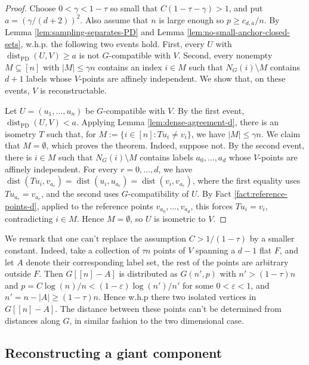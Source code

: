 \documentclass[fullpage,11pt]{article}
\newcommand{\PD}{\mathrm{PD}}
\providecommand{\dist}{\operatorname{dist}}
\theoremstyle{break}
\theoremstyle{definition}
\theoremstyle{break}
\begin{document}
\begin{proof}
Choose \(0<\gamma<1-\tau\) so small that
\(C(1-\tau-\gamma)>1\), and put \(a=(\gamma/(d+2))^2\). Also assume that
\(n\) is large enough so \(p\ge c_{d,a}/n\). By
Lemma \ref{lem:sampling-separates-PD} and Lemma \ref{lem:no-small-anchor-closed-sets},
w.h.p. the following two events hold. First, every \(U\) with
\(\dist_{\PD}(U,V)\ge a\) is not \(G\)-compatible with \(V\). Second, every
nonempty \(M\subseteq[n]\) with \(|M|\le\gamma n\) contains an index
\(i\in M\) such that \(N_G(i)\setminus M\) contains \(d+1\) labels whose
\(V\)-points are affinely independent. We show that, on these events, \(V\)
is reconstructable.

Let \(U=(u_1,\ldots,u_n)\) be \(G\)-compatible with \(V\). By the first
event, \(\dist_{\PD}(U,V)<a\). Applying Lemma \ref{lem:dense-agreement-d}, there
is an isometry \(T\) such that, for \(M:=\{i\in[n]:T u_i\ne v_i\}\), we have
\(|M|\le\gamma n\). We claim that \(M=\emptyset\), which proves the theorem.
Indeed, suppose not. By the second event, there is \(i\in M\) such that
\(N_G(i)\setminus M\) contains labels \(a_0,\ldots,a_d\) whose \(V\)-points
are affinely independent. For every \(r=0,\ldots,d\), we have
\(\dist(T u_i,v_{a_r})=\dist(u_i,u_{a_r})=\dist(v_i,v_{a_r})\), where the
first equality uses \(T u_{a_r}=v_{a_r}\), and the second uses
\(G\)-compatibility of \(U\). By Fact \ref{fact:reference-points-d}, applied to
the reference points \(v_{a_0},\ldots,v_{a_d}\), this forces \(T u_i=v_i\),
contradicting \(i\in M\). Hence \(M=\emptyset\), so \(U\) is isometric to
\(V\).
\end{proof}

We remark that one can't replace the assumption $C>1/(1-\tau)$ by a smaller constant. Indeed, take a collection of $\tau n$ points of $V$ spanning a $d-1$ flat $F$, and let $A$ denote their corresponding label set, the rest of the points are arbitrary outside $F$.  Then $G[[n]-A]$ is distributed as $G(n',p)$ with $n'>(1-\tau)n$ and $p=C \log(n)/n <(1-\varepsilon)\log(n')/n'$ for some $0<\varepsilon<1$, and $n'=n-|A|\geq (1-\tau)n$. Hence w.h.p there two isolated vertices in $G[[n]-A]$. The distance between these points can't be determined from distances along $G$, in similar fashion to the two dimensional case.


\subsection{Reconstructing a giant component}
\end{document}
